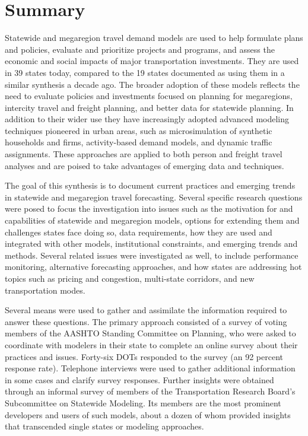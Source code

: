 \chapter*{Summary}\label{sec:summary}

Statewide and megaregion travel demand models are used to help formulate plans and policies, evaluate and prioritize projects and programs, and assess the economic and social impacts of major transportation investments. They are used in 39 states today, compared to the 19 states documented as using them in a similar synthesis a decade ago. The broader adoption of these models reflects the need to evaluate policies and investments focused on planning for megaregions, intercity travel and freight planning, and better data for statewide planning. In addition to their wider use they have increasingly adopted advanced modeling techniques pioneered in urban areas, such as microsimulation of synthetic households and firms, activity-based demand models, and dynamic traffic assignments. These approaches are applied to both person and freight travel analyses and are poised to take advantages of emerging data and techniques.

The goal of this synthesis is to document current practices and emerging trends in statewide and megaregion travel forecasting. Several specific research questions were posed to focus the investigation into issues such as the motivation for and capabilities of statewide and megaregion models, options for extending them and challenges states face doing so, data requirements, how they are used and integrated with other models, institutional constraints, and emerging trends and methods. Several related issues were investigated as well, to include performance monitoring, alternative forecasting approaches, and how states are addressing hot topics such as pricing and congestion, multi-state corridors, and new transportation modes. 

Several means were used to gather and assimilate the information required to answer these questions. The primary approach consisted of a survey of voting members of the AASHTO Standing Committee on Planning, who were asked to coordinate with modelers in their state to complete an online survey about their practices and issues. Forty-six DOTs responded to the survey (an 92 percent response rate). Telephone interviews were used to gather additional information in some cases and clarify survey responses. Further insights were obtained through an informal survey of members of the Transportation Research Board's Subcommittee on Statewide Modeling. Its members are the most prominent developers and users of such models, about a dozen of whom provided insights that transcended single states or modeling approaches.


